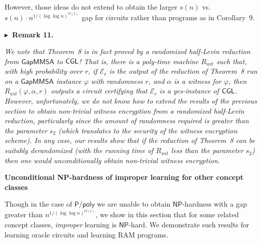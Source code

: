 


However, those ideas do not extend to obtain the larger $s(n)$ vs. $s(n)\cdot n^{1/(\log\log n)^{O(1)}}$ gap for circuits rather than programs as in Corollary 9.\par





\par\medskip\noindent\textbf{
$\blacktriangleright$ Remark 11.
}\par



\emph{We note that Theorem 8 is in fact proved by a randomized half-Levin reduction from ${\mathsf{Gap}}{\mathsf{MMSA}}$ to ${\sf CGL}$! That is, there is a poly-time machine $R_{wit}$ such that, with high probability over $r$, if $\mathcal{E}_{r}$ is the output of the reduction of Theorem 8 run on a ${\mathsf{Gap}}{\mathsf{MMSA}}$ instance $\varphi$ with randomness $r$, and $\alpha$ is a witness for $\varphi$, then $R_{wit}(\varphi,\alpha,r)$ outputs a circuit certifying that $\mathcal{E}_{r}$ is a yes-instance of ${\sf CGL}$. However, unfortunately, we do not know how to extend the results of the previous section to obtain non-trivial witness encryption from a randomized half-Levin reduction, particularly since the amount of randomness required is greater than the parameter $s_{2}$ (which translates to the security of the witness encryption scheme). In any case, our results show that if the reduction of Theorem 8 can be suitably derandomized (with the running time of $R_{wit}$ less than the parameter $s_{2}$) then one would unconditionally obtain non-trivial witness encryption.}\par







\par\medskip\noindent\textbf{Unconditional NP-hardness of improper learning for other concept classes}\par




Though in the case of ${\mathsf{P}}/{\mathsf{poly}}$ we are unable to obtain ${\mathsf{NP}}$-hardness with a gap greater than $n^{1/(\log\log n)^{O(1)}}$, we show in this section that for some related concept classes, \emph{improper} learning is ${\mathsf{NP}}$-hard. We demonstrate such results for learning oracle circuits and learning RAM programs.\par




